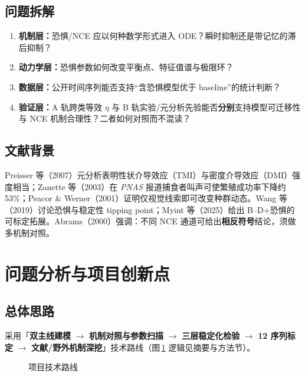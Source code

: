 \documentclass[12pt,a4paper]{ctexart}
\begin{document}
\subsection{问题拆解}

\begin{enumerate}[label=\arabic*.,leftmargin=2em]
  \item \textbf{机制层：}恐惧/NCE 应以何种数学形式进入 ODE？瞬时抑制还是带记忆的滞后抑制？
  \item \textbf{动力学层：}恐惧参数如何改变平衡点、特征值谱与极限环？
  \item \textbf{数据层：}公开时间序列能否支持“含恐惧模型优于 baseline”的统计判断？
  \item \textbf{验证层：}A 轨跨类等效 $\eta$ 与 B 轨实验/元分析先验能否\textbf{分别}支持模型可迁移性与 NCE 机制合理性？二者如何对照而不混读？
\end{enumerate}

\subsection{文献背景}

Preisser 等（2007）元分析表明性状介导效应（TMI）与密度介导效应（DMI）强度相当；Zanette 等（2003）在 \emph{PNAS} 报道捕食者叫声可使繁殖成功率下降约 53\%；Peacor \& Werner（2001）证明仅视觉线索即可改变种群动态。Wang 等（2019）讨论恐惧与稳定性 tipping point；Myint 等（2025）给出 B--D+恐惧的可标定拓展。Abrams（2000）强调：不同 NCE 通道可给出\textbf{相反符号}结论，须做多机制对照。

\section{问题分析与项目创新点}

\subsection{总体思路}

采用「\textbf{双主线建模} $\rightarrow$ \textbf{机制对照与参数扫描} $\rightarrow$ \textbf{三层稳定化检验} $\rightarrow$ \textbf{12 序列标定} $\rightarrow$ \textbf{文献/野外机制深挖}」技术路线（图\,\ref{fig:workflow} 逻辑见摘要与方法节）。

\begin{figure}[H]
  \centering
  \caption{项目技术路线}
  \label{fig:workflow}
\end{figure}
\end{document}
